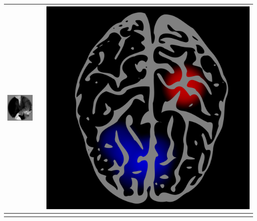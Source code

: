 \documentclass{beamer}
\begin{document}
\begin{frame}
\begin{center}
\begin{tabular}{ccc}
\includegraphics[scale = .52]{img2.png} & \hspace{1in} & \includegraphics[scale = 0.07]{brain2.png} \\ \hline
\hspace{1in} & \hspace{1in} & \hspace{1in}
\end{tabular}
\end{center}
\end{frame}
\end{document}
